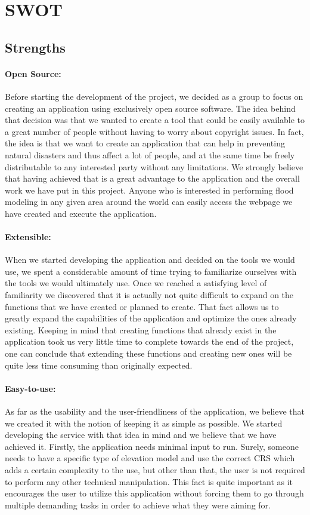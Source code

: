 \section{SWOT}
\subsection{Strengths}
\paragraph{Open Source:} Before starting the development of the project, we decided as  a group to focus on creating an application using exclusively open source software. The idea behind that decision was that we wanted to create a tool that could be easily available to a great number of people without having to worry about copyright issues. In fact, the idea is that we want to create an application that can help in preventing natural disasters and thus affect a lot of people, and at the same time be freely distributable to any interested party without any limitations. We strongly believe that having achieved that is a great advantage to the application and the overall work we have put in this project. Anyone who is interested in performing flood modeling in any given area around the world can easily access the webpage we have created and execute the application.

\paragraph{Extensible:} When we started developing the application and decided on the tools we would use, we spent a considerable  amount of time trying to familiarize ourselves with the tools we would ultimately use. Once we reached a satisfying level of familiarity we discovered that it is actually not quite difficult to expand on the functions that we have created or planned to create. That fact allows us to greatly expand the capabilities of the application and optimize the ones already existing. Keeping in mind that creating functions that already exist in the application took us very little time to complete towards the end of the project, one can conclude that extending these functions and creating new ones will be quite less time consuming than originally expected.

\paragraph{Easy-to-use:} As far as the usability and the user-friendliness of the application, we believe that we created it with the notion of keeping it as simple as possible. We started developing the service with that idea in mind and we believe that we have achieved it. Firstly, the application needs minimal input to run. Surely, someone needs to have a specific type of elevation model and use the correct CRS which adds a certain complexity to the use, but other than that, the user is not required to perform any other technical manipulation. This fact is quite important as it encourages the user to utilize this application without forcing them to go through multiple demanding tasks in order to achieve what they were aiming for.

